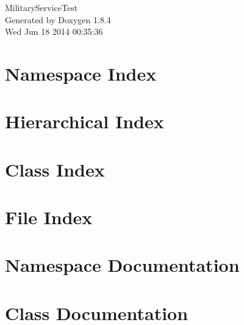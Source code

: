\documentclass[twoside]{book}
\newcommand{\clearemptydoublepage}{%
  \newpage{\pagestyle{empty}\cleardoublepage}%
}
\begin{document}
\hypersetup{pageanchor=false}
\begin{titlepage}
\vspace*{7cm}
\begin{center}%
{\Large Military\-Service\-Test }\\
\vspace*{1cm}
{\large Generated by Doxygen 1.8.4}\\
\vspace*{0.5cm}
{\small Wed Jun 18 2014 00:35:36}\\
\end{center}
\end{titlepage}
\clearemptydoublepage
\tableofcontents
\clearemptydoublepage
{}
\hypersetup{pageanchor=true}

\chapter{Namespace Index}

\chapter{Hierarchical Index}

\chapter{Class Index}

\chapter{File Index}

\chapter{Namespace Documentation}

\chapter{Class Documentation}






















\end{document}
